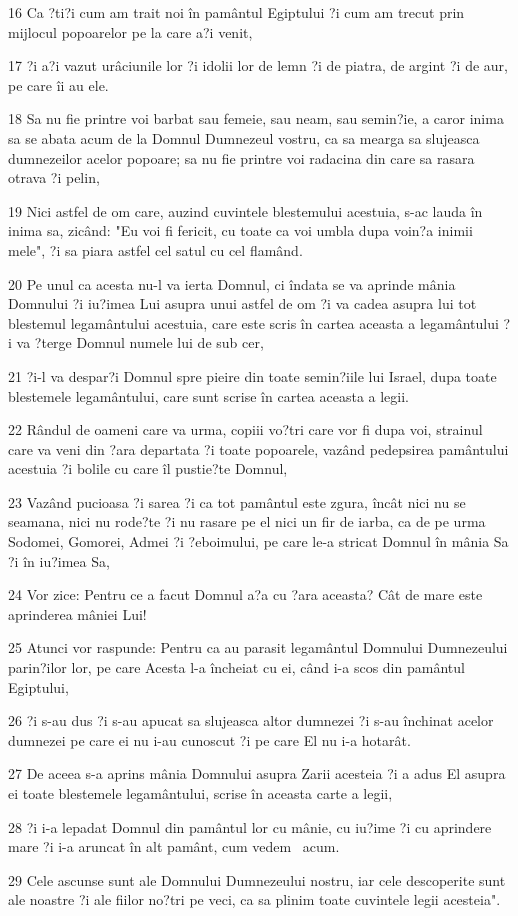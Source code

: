 \par 16 Ca ?ti?i cum am trait noi în pamântul Egiptului ?i cum am trecut prin mijlocul popoarelor pe la care a?i venit,
\par 17 ?i a?i vazut urâciunile lor ?i idolii lor de lemn ?i de piatra, de argint ?i de aur, pe care îi au ele.
\par 18 Sa nu fie printre voi barbat sau femeie, sau neam, sau semin?ie, a caror inima sa se abata acum de la Domnul Dumnezeul vostru, ca sa mearga sa slujeasca dumnezeilor acelor popoare; sa nu fie printre voi radacina din care sa rasara otrava ?i pelin,
\par 19 Nici astfel de om care, auzind cuvintele blestemului acestuia, s-ac lauda în inima sa, zicând: "Eu voi fi fericit, cu toate ca voi umbla dupa voin?a inimii mele", ?i sa piara astfel cel satul cu cel flamând.
\par 20 Pe unul ca acesta nu-l va ierta Domnul, ci îndata se va aprinde mânia Domnului ?i iu?imea Lui asupra unui astfel de om ?i va cadea asupra lui tot blestemul legamântului acestuia, care este scris în cartea aceasta a legamântului ?i va ?terge Domnul numele lui de sub cer,
\par 21 ?i-l va despar?i Domnul spre pieire din toate semin?iile lui Israel, dupa toate blestemele legamântului, care sunt scrise în cartea aceasta a legii.
\par 22 Rândul de oameni care va urma, copiii vo?tri care vor fi dupa voi, strainul care va veni din ?ara departata ?i toate popoarele, vazând pedepsirea pamântului acestuia ?i bolile cu care îl pustie?te Domnul,
\par 23 Vazând pucioasa ?i sarea ?i ca tot pamântul este zgura, încât nici nu se seamana, nici nu rode?te ?i nu rasare pe el nici un fir de iarba, ca de pe urma Sodomei, Gomorei, Admei ?i ?eboimului, pe care le-a stricat Domnul în mânia Sa ?i în iu?imea Sa,
\par 24 Vor zice: Pentru ce a facut Domnul a?a cu ?ara aceasta? Cât de mare este aprinderea mâniei Lui!
\par 25 Atunci vor raspunde: Pentru ca au parasit legamântul Domnului Dumnezeului parin?ilor lor, pe care Acesta l-a încheiat cu ei, când i-a scos din pamântul Egiptului,
\par 26 ?i s-au dus ?i s-au apucat sa slujeasca altor dumnezei ?i s-au închinat acelor dumnezei pe care ei nu i-au cunoscut ?i pe care El nu i-a hotarât.
\par 27 De aceea s-a aprins mânia Domnului asupra Zarii acesteia ?i a adus El asupra ei toate blestemele legamântului, scrise în aceasta carte a legii,
\par 28 ?i i-a lepadat Domnul din pamântul lor cu mânie, cu iu?ime ?i cu aprindere mare ?i i-a aruncat în alt pamânt, cum vedem  acum.
\par 29 Cele ascunse sunt ale Domnului Dumnezeului nostru, iar cele descoperite sunt ale noastre ?i ale fiilor no?tri pe veci, ca sa plinim toate cuvintele legii acesteia".

